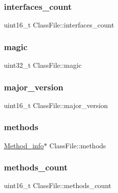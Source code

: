 \subsubsection{\texorpdfstring{interfaces\+\_\+count}{interfaces\_count}}
{\footnotesize\ttfamily uint16\+\_\+t Class\+File\+::interfaces\+\_\+count}

\hypertarget{struct_class_file_a9d4d72751ff9250dd3305d5d853f7921}{}\label{struct_class_file_a9d4d72751ff9250dd3305d5d853f7921} 
\subsubsection{\texorpdfstring{magic}{magic}}
{\footnotesize\ttfamily uint32\+\_\+t Class\+File\+::magic}

\hypertarget{struct_class_file_a931ebda6a22c18e009891d40016b2790}{}\label{struct_class_file_a931ebda6a22c18e009891d40016b2790} 
\subsubsection{\texorpdfstring{major\+\_\+version}{major\_version}}
{\footnotesize\ttfamily uint16\+\_\+t Class\+File\+::major\+\_\+version}

\hypertarget{struct_class_file_a5906980e6c5121e5a864346fd3617083}{}\label{struct_class_file_a5906980e6c5121e5a864346fd3617083} 
\subsubsection{\texorpdfstring{methods}{methods}}
{\footnotesize\ttfamily \hyperlink{struct_method__info}{Method\+\_\+info}$\ast$ Class\+File\+::methods}

\hypertarget{struct_class_file_a479310e3e0674d9171d24beb794fcb14}{}\label{struct_class_file_a479310e3e0674d9171d24beb794fcb14} 
\subsubsection{\texorpdfstring{methods\+\_\+count}{methods\_count}}
{\footnotesize\ttfamily uint16\+\_\+t Class\+File\+::methods\+\_\+count}

